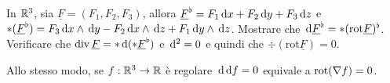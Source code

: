\begin{exercise} %
	In $\mathbb R^3$, sia $\underline F=(F_1,F_2,F_3)$, allora $\underline F^\flat = F_1 \,\mathrm d x + F_2 \,\mathrm d y + F_3 \,\mathrm d z$ e
	$*(\underline F^\flat) = F_3\,\mathrm d x \wedge \,\mathrm d y - F_2 \,\mathrm d x \wedge \,\mathrm d z + F_1 \,\mathrm d y \wedge \,\mathrm d z$.
	Mostrare che $\,\mathrm d \underline{F}^\flat = *(\mathrm{rot} \underline{F})^\flat$.	
	Verificare che $\operatorname{div} \underline F = *\,\mathrm d(* \underline F^\flat)$ e $\,\mathrm d^2 = 0$ e quindi che $\div (\mathrm{rot} \underline F)=0$.
	
	Allo stesso modo, se $f:\mathbb R^3\to\mathbb R$ è regolare $\,\mathrm d\,\mathrm d f=0$ equivale a $\mathrm{rot}(\nabla f)=0$.
\end{exercise}
























































































